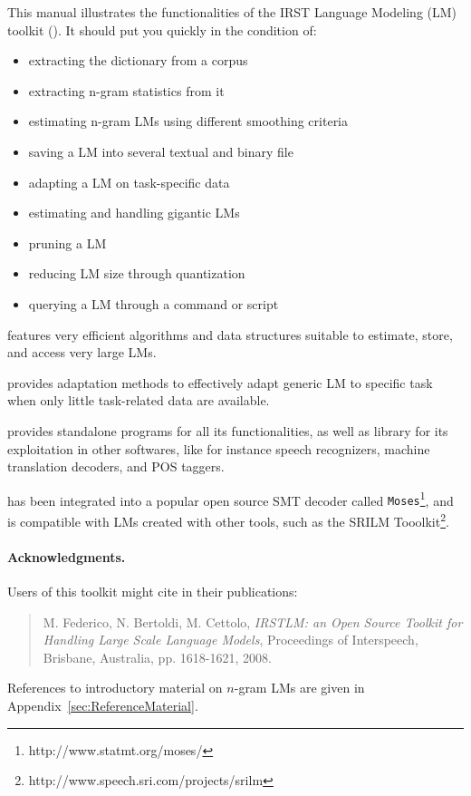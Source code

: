 This manual illustrates the functionalities of  the IRST Language  Modeling (LM)  toolkit ({\IRSTLM}). It  should  
put you quickly  in  the condition of:
\begin{itemize}
\item extracting the dictionary from a corpus
\item extracting n-gram statistics from it
\item estimating n-gram LMs using different smoothing criteria
\item saving a LM into several textual and binary file
\item adapting a LM on task-specific data
\item estimating and handling gigantic LMs
\item pruning a LM
\item reducing LM size through quantization
\item querying a LM through a command or script
\end{itemize}

\noindent
{\IRSTLM} features very efficient algorithms and data structures suitable to estimate, store, and access very  large LMs. 

\noindent
{\IRSTLM} provides adaptation methods to effectively adapt generic LM to specific task when only little task-related data are available. 

\noindent
{\IRSTLM} provides standalone programs for all its functionalities, as well as library for its exploitation in other softwares, like for instance speech recognizers, machine translation decoders, and POS taggers.

\noindent
{\IRSTLM} has been integrated into a popular open source SMT decoder  called {\tt Moses}\footnote{http://www.statmt.org/moses/}, and is compatible with LMs created with other tools, such as the SRILM Tooolkit\footnote{http://www.speech.sri.com/projects/srilm}.


\paragraph{Acknowledgments.}Users of this toolkit  might cite in their publications:
\begin{quote}
M. Federico,  N. Bertoldi,  M. Cettolo, {\em IRSTLM: an Open Source Toolkit for Handling Large Scale Language Models}, Proceedings of Interspeech, Brisbane, Australia, pp. 1618-1621, 2008.
\end{quote}

\noindent
References to introductory material on $n$-gram LMs are given in Appendix~\ref{sec:ReferenceMaterial}. 

